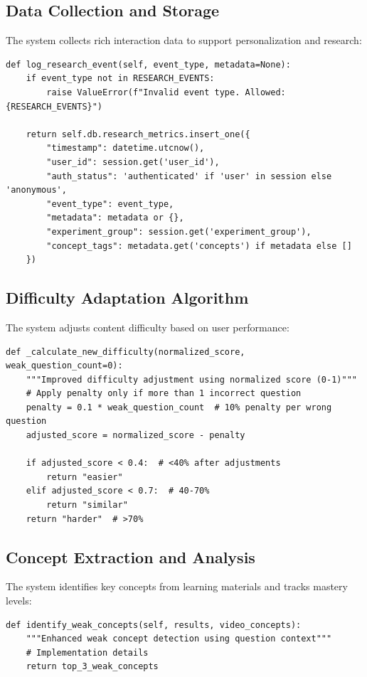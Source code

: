 \documentclass[conference]{IEEEtran}
\begin{document}
\subsection{Data Collection and Storage}
The system collects rich interaction data to support personalization and research:

\begin{verbatim}
def log_research_event(self, event_type, metadata=None):
    if event_type not in RESEARCH_EVENTS:
        raise ValueError(f"Invalid event type. Allowed: {RESEARCH_EVENTS}")
    
    return self.db.research_metrics.insert_one({
        "timestamp": datetime.utcnow(),
        "user_id": session.get('user_id'),
        "auth_status": 'authenticated' if 'user' in session else 'anonymous',
        "event_type": event_type,
        "metadata": metadata or {},
        "experiment_group": session.get('experiment_group'),
        "concept_tags": metadata.get('concepts') if metadata else []
    })
\end{verbatim}

\subsection{Difficulty Adaptation Algorithm}
The system adjusts content difficulty based on user performance:

\begin{verbatim}
def _calculate_new_difficulty(normalized_score, weak_question_count=0):
    """Improved difficulty adjustment using normalized score (0-1)"""
    # Apply penalty only if more than 1 incorrect question
    penalty = 0.1 * weak_question_count  # 10% penalty per wrong question
    adjusted_score = normalized_score - penalty
    
    if adjusted_score < 0.4:  # <40% after adjustments
        return "easier"
    elif adjusted_score < 0.7:  # 40-70%
        return "similar"
    return "harder"  # >70%
\end{verbatim}

\subsection{Concept Extraction and Analysis}
The system identifies key concepts from learning materials and tracks mastery levels:

\begin{verbatim}
def identify_weak_concepts(self, results, video_concepts):
    """Enhanced weak concept detection using question context"""
    # Implementation details
    return top_3_weak_concepts
\end{verbatim}
\end{document}

